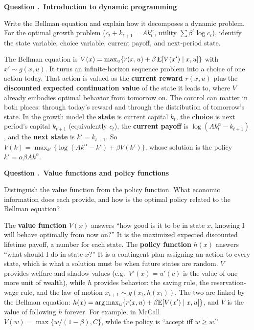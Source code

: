 \documentclass[11pt]{article}
\newcounter{qn}
\newcommand{\question}[1]{\refstepcounter{qn}\par\medskip
{\bfseries\color{ink}Question \theqn.\ #1}\par\smallskip}
\begin{document}
\question{Introduction to dynamic programming}
Write the Bellman equation and explain how it decomposes a dynamic problem. For the optimal growth problem ($c_t+k_{t+1}=Ak_t^\alpha$, utility $\sum\beta^t\log c_t$), identify the state variable, choice variable, current payoff, and next-period state.

\begin{answer}
The Bellman equation is $V(x)=\max_{u}\{r(x,u)+\beta\,\mathrm{E}[V(x')\mid x,u]\}$ with $x'\sim g(x,u)$. It turns an infinite-horizon sequence problem into a choice of one action today. That action is valued as the \textbf{current reward} $r(x,u)$ plus the \textbf{discounted expected continuation value} of the state it leads to, where $V$ already embodies optimal behavior from tomorrow on. The control can matter in both places: through today's reward and through the distribution of tomorrow's state. In the growth model the \textbf{state} is current capital $k_t$, the \textbf{choice} is next period's capital $k_{t+1}$ (equivalently $c_t$), the \textbf{current payoff} is $\log(Ak_t^\alpha-k_{t+1})$, and the \textbf{next state} is $k'=k_{t+1}$. So $V(k)=\max_{k'}\{\log(Ak^\alpha-k')+\beta V(k')\}$, whose solution is the policy $k'=\alpha\beta Ak^\alpha$.
\end{answer}

\question{Value functions and policy functions}
Distinguish the value function from the policy function. What economic information does each provide, and how is the optimal policy related to the Bellman equation?

\begin{answer}
The \textbf{value function} $V(x)$ answers ``how good is it to be in state $x$, knowing I will behave optimally from now on?'' It is the maximized expected discounted lifetime payoff, a number for each state. The \textbf{policy function} $h(x)$ answers ``what should I do in state $x$?'' It is a contingent plan assigning an action to every state, which is what a solution must be when future states are random. $V$ provides welfare and shadow values (e.g.\ $V'(x)=u'(c)$ is the value of one more unit of wealth), while $h$ provides behavior: the saving rule, the reservation-wage rule, and the law of motion $x_{t+1}\sim g(x_t,h(x_t))$. The two are linked by the Bellman equation: $h(x)=\arg\max_u\{r(x,u)+\beta\mathrm{E}[V(x')\mid x,u]\}$, and $V$ is the value of following $h$ forever. For example, in McCall $V(w)=\max\{w/(1-\beta),C\}$, while the policy is ``accept iff $w\ge\bar w$.''
\end{answer}
\end{document}
